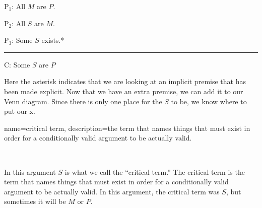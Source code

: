  \begin{earg}
\item[P$_1$:] All $M$ are $P$.
\item[P$_2$:] All $S$ are $M$.
\item[P$_3$:] Some $S$ exists.*
\vspace{-.5em}
\item [] \rule{0.2\linewidth}{.5pt} 
\item[C:] Some $S$ are $P$
\end{earg} 
 
Here the asterisk indicates that we are looking at an implicit premise that has been made explicit. Now that we have an extra premise, we can add it to our Venn diagram. Since there is only one place for the $S$ to be, we know where to put our x. \label{CVFex1}

\begin{center}
\end{center}


{
name=critical term,
description={the term that names things that must exist in order for a conditionally valid argument to be actually valid.}
}

\

In this argument $S$ is what we call the ``critical term.'' The \gls{critical term} \label{def:critical_term} is the term that names things that must exist in order for a conditionally valid argument to be actually valid. In this argument, the critical term was $S$, but sometimes it will be $M$ or $P$. 

